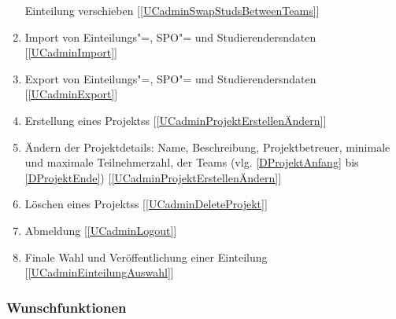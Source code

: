 \documentclass[parskip=full]{scrartcl}
\newcommand{\swtLabel}[1]{\textbf{/#1\arabic*0/}}
\newcommand{\testRef}[1]{[\ref{#1}]}
\begin{document}
\begin{enumerate}[label=\swtLabel{FA}, resume]
  \gls{Einteilung} verschieben  \label{FAadminMoveStudsBetweenTeams} \testRef{UCadminSwapStudsBetweenTeams}
  \item Import von \gls{Einteilung}s"=, \gls{SPO}"= und \glspl{Studierender}ndaten \label{FAimport} \testRef{UCadminImport}
  \item Export von \gls{Einteilung}s"=, \gls{SPO}"= und \glspl{Studierender}ndaten \label{FAexport}\testRef{UCadminExport}
  \item Erstellung eines \glspl{Projekt}s \label{FAadminCreateProjekt}
  \testRef{UCadminProjektErstellenÄndern}
  \item Ändern der \gls{Projektdetails}: Name, Beschreibung, \gls{Projektbetreuer}, %
        minimale und maximale Teilnehmerzahl,  der \glspl{Team} (vlg.
        \ref{DProjektAnfang} bis \ref{DProjektEnde})
        \label{FAadminProjektänderung} \testRef{UCadminProjektErstellenÄndern}
  \item Löschen eines \glspl{Projekt}s \label{FAadminDeleteProjekt}
  \testRef{UCadminDeleteProjekt}
  \item Abmeldung \label{FAadminAbmeldung} \testRef{UCadminLogout}
  \item Finale Wahl und Veröffentlichung einer \gls{Einteilung} \label{FAadminAuswahl}
  \testRef{UCadminEinteilungAuswahl}
\end{enumerate}

\subsubsection{Wunschfunktionen}
\end{document}
